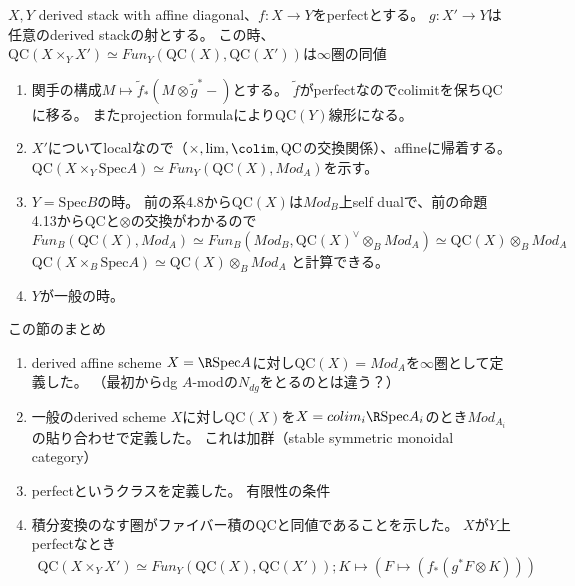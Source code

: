\documentclass[dvipdfmx]{beamer}
\newcommand{\QC}{\mathrm{QC}}
\newcommand{\spec}{\mathrm{Spec}}
\begin{document}
\begin{frame}
\begin{thm}[BFNのTheorem 4.14]
$X, Y$ derived stack with affine diagonal、$f:X \to Y$をperfectとする。
$g:X' \to Y$は任意のderived stackの射とする。
この時、$\QC (X \times_Y X') \simeq Fun_Y(\QC(X),\QC(X'))$は$\infty$圏の同値
\end{thm}
\begin{enumerate}
\item 関手の構成$M\mapsto \tilde{f}_*(M\otimes\tilde{g}^*-)$とする。
$\tilde{f}$がperfectなのでcolimitを保ち$\QC$に移る。
またprojection formulaにより$\QC(Y)$線形になる。

\item $X'$についてlocalなので（$\times, \lim, \colim, \QC$の交換関係）、affineに帰着する。
$\QC(X\times_Y\spec A) \simeq Fun_Y(\QC(X),Mod_A)$を示す。

\item $Y=\spec B$の時。
前の系4.8から$\QC(X)$は$Mod_B$上self dualで、前の命題4.13から$\QC$と$\otimes$の交換がわかるので
$Fun_B(\QC(X),Mod_A)\simeq Fun_B(Mod_B,\QC(X)^\vee\otimes_BMod_A)\simeq \QC(X)\otimes_BMod_A$
$\QC(X\times_B\spec A)\simeq \QC(X)\otimes_BMod_A$
と計算できる。

\item $Y$が一般の時。
\end{enumerate}
\end{frame}

\begin{frame}{この節のまとめ}
\begin{enumerate}
\item derived affine scheme $X=\R \spec A$に対し$\QC(X)=Mod_A$を$\infty$圏として定義した。
（最初からdg $A$-modの$N_{dg}$をとるのとは違う？）

\item 一般のderived scheme $X$に対し$\QC(X)$を$X=colim_i\R \spec A_i$のとき$Mod_{A_i}$の貼り合わせで定義した。
これは加群（stable symmetric monoidal category）

\item perfectというクラスを定義した。
有限性の条件

\item 積分変換のなす圏がファイバー積の$\QC$と同値であることを示した。
$X$が$Y$上perfectなとき
\begin{align*}
\QC(X\times_YX') \simeq Fun_Y(\QC(X), \QC(X')); K \mapsto (F \mapsto (f_*(g^*F\otimes K)))
\end{align*}
\end{enumerate}
\end{frame}
\end{document}
